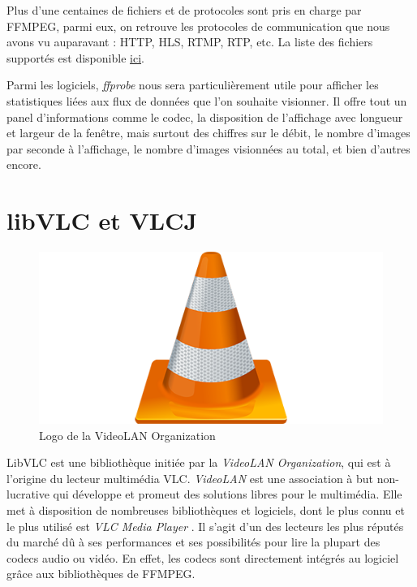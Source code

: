 \documentclass{polytech/polytech}
\begin{document}
Plus d’une centaines de fichiers et de protocoles sont pris en charge par FFMPEG, parmi eux, on retrouve les protocoles de communication que nous avons vu auparavant : HTTP, HLS, RTMP, RTP, etc. La liste des fichiers supportés est disponible \href{http://ffmpeg.org/general.html#Supported-File-Formats_002c-Codecs-or-Features}{ici}.

Parmi les logiciels, \textit{ffprobe} nous sera particulièrement utile pour afficher les statistiques liées aux flux de données que l’on souhaite visionner. Il offre tout un panel d’informations comme le codec, la disposition de l’affichage avec longueur et largeur de la fenêtre, mais surtout des chiffres sur le débit, le nombre d’images par seconde à l’affichage, le nombre d’images visionnées au total, et bien d’autres encore.


\section{libVLC et VLCJ}

\begin{figure}
	\includegraphics[scale=0.5]{images/vlc-media-player-logo}
	\caption{Logo de la VideoLAN Organization}
	\label{fig:logovlc}
\end{figure}

LibVLC est une bibliothèque initiée par la \textit{VideoLAN Organization}, qui est à l’origine du lecteur multimédia VLC. \textit{VideoLAN} est une association à but non-lucrative qui développe et promeut des solutions libres pour le multimédia. Elle met à disposition de nombreuses bibliothèques et logiciels, dont le plus connu et le plus utilisé est \textit{VLC Media Player} \cite{_vlc:_2017}. Il s’agit d’un des lecteurs les plus réputés du marché dû à ses performances et ses possibilités pour lire la plupart des codecs audio ou vidéo. En effet, les codecs sont directement intégrés au logiciel grâce aux bibliothèques de FFMPEG.
\end{document}
